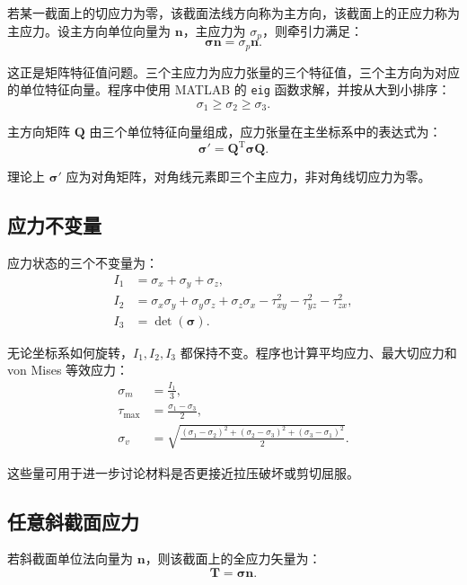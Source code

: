 \documentclass[UTF8,a4paper,12pt]{ctexart}
\newcommand{\stress}{\bm{\sigma}}
\newcommand{\vect}[1]{\bm{#1}}
\begin{document}
若某一截面上的切应力为零，该截面法线方向称为主方向，该截面上的正应力称为主应力。设主方向单位向量为 $\vect n$，主应力为 $\sigma_p$，则牵引力满足：
\begin{equation}
\stress \vect n = \sigma_p \vect n .
\end{equation}

这正是矩阵特征值问题。三个主应力为应力张量的三个特征值，三个主方向为对应的单位特征向量。程序中使用 MATLAB 的 \verb|eig| 函数求解，并按从大到小排序：
\begin{equation}
\sigma_1 \geq \sigma_2 \geq \sigma_3 .
\end{equation}

主方向矩阵 $\vect Q$ 由三个单位特征向量组成，应力张量在主坐标系中的表达式为：
\begin{equation}
\stress' = \vect Q^{\mathrm T} \stress \vect Q .
\end{equation}

理论上 $\stress'$ 应为对角矩阵，对角线元素即三个主应力，非对角线切应力为零。

\subsection{应力不变量}

应力状态的三个不变量为：
\begin{align}
I_1 &= \sigma_x+\sigma_y+\sigma_z,\\
I_2 &= \sigma_x\sigma_y+\sigma_y\sigma_z+\sigma_z\sigma_x
      -\tau_{xy}^2-\tau_{yz}^2-\tau_{zx}^2,\\
I_3 &= \det(\stress).
\end{align}

无论坐标系如何旋转，$I_1,I_2,I_3$ 都保持不变。程序也计算平均应力、最大切应力和 von Mises 等效应力：
\begin{align}
\sigma_m &= \frac{I_1}{3},\\
\tau_{\max} &= \frac{\sigma_1-\sigma_3}{2},\\
\sigma_v &= \sqrt{
\frac{(\sigma_1-\sigma_2)^2+(\sigma_2-\sigma_3)^2+(\sigma_3-\sigma_1)^2}{2}
}.
\end{align}

这些量可用于进一步讨论材料是否更接近拉压破坏或剪切屈服。

\subsection{任意斜截面应力}

若斜截面单位法向量为 $\vect n$，则该截面上的全应力矢量为：
\begin{equation}
\vect T = \stress \vect n .
\end{equation}
\end{document}
